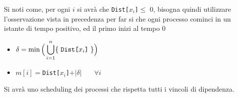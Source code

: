 \documentclass[12pt, letterpaper]{article}
\newcommand{\codee}[1]{\colorbox{white}{\texttt{#1}}}
\begin{document}
Si noti come, per ogni $i$ si avrà che \codee{Dist[$x_i$]}$\le$ 0, bisogna quindi utilizzare l'osservazione vista in precedenza per far 
si che ogni processo cominci in un istante di tempo positivo, ed il primo inizi al tempo 0\begin{itemize}
    \item $\delta = \min\Big(\displaystyle\bigcup_{i=1}^n\{\text{\codee{Dist[$x_i$]}}\}\Big)$
    \item $m[i]=$\codee{Dist[$x_i$]}$+|\delta|\;\;\;\;\,\;\;\forall i$
\end{itemize}
Si avrà uno scheduling dei processi che rispetta tutti i vincoli di dipendenza.
\end{document}
